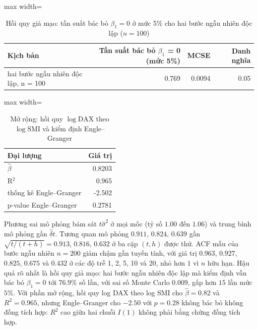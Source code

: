 \begin{table}[H]
\centering\footnotesize
\caption{Hồi quy giả mạo: tần suất bác bỏ $\beta_1=0$ ở mức 5\% cho hai bước ngẫu nhiên độc lập ($n=100$)}\label{tab:tab_b12_02_spurious_regression}
\begin{adjustbox}{max width=\linewidth}
\begin{tabular}{|>{\raggedright\arraybackslash}p{}|r|r|r|}
\toprule
Kịch bản & Tần suất bác bỏ $\beta_{1}$ = 0 (mức 5\%) & MCSE & Danh nghĩa \\
\midrule
hai bước ngẫu nhiên độc lập, n = 100 & 0.769 & 0.0094 & 0.05 \\[3pt]
\bottomrule
\end{tabular}
\end{adjustbox}
\end{table}
\begin{table}[H]
\centering\footnotesize
\caption{Mở rộng: hồi quy $\log\mathrm{DAX}$ theo $\log\mathrm{SMI}$ và kiểm định Engle--Granger}\label{tab:tab_b12_ext_cointegration}
\begin{adjustbox}{max width=\linewidth}
\begin{tabular}{|l|r|}
\toprule
Đại lượng & Giá trị \\
\midrule
$\hat{\beta}$ & 0.8203 \\
R$^{2}$ & 0.965 \\
thống kê Engle–Granger & -2.502 \\
p-value Engle–Granger & 0.2781 \\
\bottomrule
\end{tabular}
\end{adjustbox}
\end{table}
 Phương sai mô phỏng bám sát $t\hat\sigma^2$ ở mọi mốc (tỷ số $1.00$ đến $1.06$) và trung bình mô phỏng gần $\hat\delta t$. Tương quan mô phỏng $0.911$, $0.824$, $0.639$ gần $\sqrt{t/(t+h)}=0.913$, $0.816$, $0.632$ ở ba cặp $(t,h)$ được thử. ACF mẫu của bước ngẫu nhiên $n=200$ giảm chậm gần tuyến tính, với giá trị $0.963$, $0.927$, $0.825$, $0.675$ và $0.432$ ở các độ trễ 1, 2, 5, 10 và 20, nhỏ hơn $1$ vì $n$ hữu hạn. Hậu quả rõ nhất là hồi quy giả mạo: hai bước ngẫu nhiên độc lập mà kiểm định vẫn bác bỏ $\beta_1=0$ tới $76.9\%$ số lần, với sai số Monte Carlo $0.009$, gấp hơn $15$ lần mức $5\%$. Với phần mở rộng, hồi quy log DAX theo log SMI cho $\hat\beta=0.82$ và $R^2=0.965$, nhưng Engle--Granger cho $-2.50$ với $p=0.28$ không bác bỏ không đồng tích hợp: $R^2$ cao giữa hai chuỗi $I(1)$ không phải bằng chứng đồng tích hợp.

